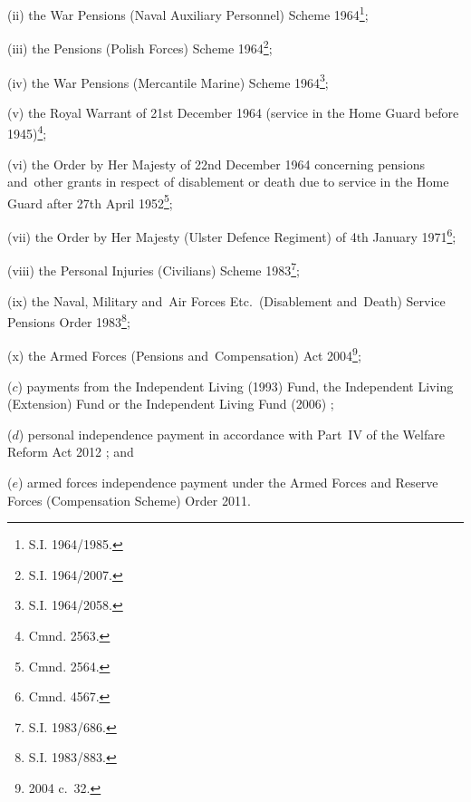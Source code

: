 \documentclass[12pt,a4paper]{article}
\begin{document}
\begin{enumerate}
\begin{enumerate}
(ii) the War Pensions (Naval Auxiliary Personnel) Scheme 1964\footnote{\frenchspacing S.I. 1964/1985.};

(iii) the Pensions (Polish Forces) Scheme 1964\footnote{\frenchspacing S.I. 1964/2007.};

(iv) the War Pensions (Mercantile Marine) Scheme 1964\footnote{\frenchspacing S.I. 1964/2058.};

(v) the Royal Warrant of 21st December 1964 (service in the Home Guard before 1945)\footnote{\frenchspacing Cmnd. 2563.};

(vi) the Order by Her Majesty of 22nd December 1964 concerning pensions and~other grants in respect of disablement or death due to service in the Home Guard after 27th April 1952\footnote{\frenchspacing Cmnd. 2564.};

(vii) the Order by Her Majesty (Ulster Defence Regiment) of 4th January 1971\footnote{\frenchspacing Cmnd. 4567.};

(viii) the Personal Injuries (Civilians) Scheme 1983\footnote{\frenchspacing S.I. 1983/686.};

(ix) the Naval, Military and~Air Forces Etc.\ (Disablement and~Death) Service Pensions Order 1983\footnote{\frenchspacing S.I. 1983/883.}; 

(x) the Armed Forces (Pensions and~Compensation) Act 2004\footnote{2004 c.\ 32.}; 
\end{enumerate}

($c$) payments from 
the Independent Living (1993) Fund, the Independent Living (Extension) Fund or the Independent Living Fund (2006)%
%
; %

($d$) personal independence payment in accordance with Part~IV of the Welfare Reform Act 2012%
%
; and

($e$) armed forces independence payment under the Armed Forces and Reserve Forces (Compensation Scheme) Order 2011.
\end{enumerate}
\end{document}
